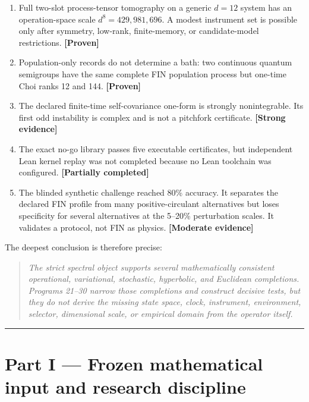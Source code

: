 \documentclass[11pt,a4paper,openany]{report}
\newcommand{\statusProven}{\textcolor{fingreen}{[Proven]}}
\newcommand{\statusStrong}{\textcolor{finblue}{[Strong evidence]}}
\newcommand{\statusModerate}{\textcolor{finviolet}{[Moderate evidence]}}
\begin{document}
\begin{enumerate}
\item 
Full two-slot process-tensor tomography on a generic \(d=12\) system has an operation-space scale \(d^8=429,981,696\). A modest instrument set is possible only after symmetry, low-rank, finite-memory, or candidate-model restrictions. \textbf{\statusProven{}}

\item 
Population-only records do not determine a bath: two continuous quantum semigroups have the same complete FIN population process but one-time Choi ranks 12 and 144. \textbf{\statusProven{}}

\item 
The declared finite-time self-covariance one-form is strongly nonintegrable. Its first odd instability is complex and is not a pitchfork certificate. \textbf{\statusStrong{}}

\item 
The exact no-go library passes five executable certificates, but independent Lean kernel replay was not completed because no Lean toolchain was configured. \textbf{[Partially completed]}

\item 
The blinded synthetic challenge reached 80\% accuracy. It separates the declared FIN profile from many positive-circulant alternatives but loses specificity for several alternatives at the 5–20\% perturbation scales. It validates a protocol, not FIN as physics. \textbf{\statusModerate{}}

\end{enumerate}

The deepest conclusion is therefore precise:

\begin{quote}\itshape
The strict spectral object supports several mathematically consistent operational, variational, stochastic, hyperbolic, and Euclidean completions. Programs 21–30 narrow those completions and construct decisive tests, but they do not derive the missing state space, clock, instrument, environment, selector, dimensional scale, or empirical domain from the operator itself.

\end{quote}

\par\medskip\hrule\medskip

\chapter{Part I — Frozen mathematical input and research discipline}
\end{document}

